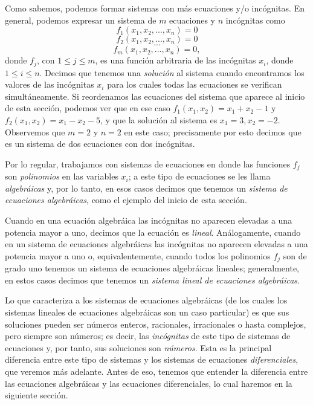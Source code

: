 \documentclass[12pt,dvipsnames]{article}
\begin{document}
\vspace{3mm}
Como sabemos, podemos formar sistemas con más ecuaciones y/o incógnitas. En general, podemos expresar un sistema de $m$ ecuaciones y $n$ incógnitas como $$f_1(x_1,x_2,...,x_n)=0$$ $$f_2(x_1,x_2,...,x_n)=0$$ $$...$$ $$f_m(x_1,x_2,...,x_n)=0,$$ donde $f_j$, con $1\leq j\leq m$, es una función arbitraria de las incógnitas $x_i$, donde $1\leq i\leq n$. Decimos que tenemos una \emph{solución} al sistema cuando encontramos los valores de las incógnitas $x_i$ para los cuales todas las ecuaciones se verifican simultáneamente. Si reordenamos las ecuaciones del sistema que aparece al inicio de esta sección, podemos ver que en ese caso $f_1(x_1,x_2)=x_1+x_2-1$ y $f_2(x_1,x_2)=x_1-x_2-5$, y que la solución al sistema es $x_1=3, x_2=-2$. Observemos que $m=2$ y $n=2$ en este caso; precisamente por esto decimos que es un sistema de dos ecuaciones con dos incógnitas.

\vspace{3mm}
Por lo regular, trabajamos con sistemas de ecuaciones en donde las funciones $f_j$ son \emph{polinomios} en las variables $x_i$; a este tipo de ecuaciones se les llama \emph{algebráicas} y, por lo tanto, en esos casos decimos que tenemos un \emph{sistema de ecuaciones algebráicas}, como el ejemplo del inicio de esta sección.

\vspace{3mm}
Cuando en una ecuación algebráica las incógnitas no aparecen elevadas a una potencia mayor a uno, decimos que la ecuación es \emph{lineal}. Análogamente, cuando en un sistema de ecuaciones algebráicas las incógnitas no aparecen elevadas a una potencia mayor a uno \textemdash o, equivalentemente, cuando todos los polinomios $f_j$ son de grado uno\textemdash\hspace{1mm} tenemos un sistema de ecuaciones algebráicas lineales; generalmente, en estos casos decimos que tenemos un \emph{sistema lineal de ecuaciones algebráicas}.

\vspace{3mm}
Lo que caracteriza a los sistemas de ecuaciones algebráicas (de los cuales los sistemas lineales de ecuaciones algebráicas son un caso particular) es que sus soluciones pueden ser números enteros, racionales, irracionales o hasta complejos, pero siempre son números; es decir, las \emph{incógnitas} de este tipo de sistemas de ecuaciones \textemdash y, por tanto, sus soluciones\textemdash\hspace{1mm} son \emph{números}. Esta es la principal diferencia entre este tipo de sistemas y los sistemas de ecuaciones \emph{diferenciales}, que veremos más adelante. Antes de eso, tenemos que entender la diferencia entre las ecuaciones algebráicas y las ecuaciones diferenciales, lo cual haremos en la siguiente sección.
\end{document}
